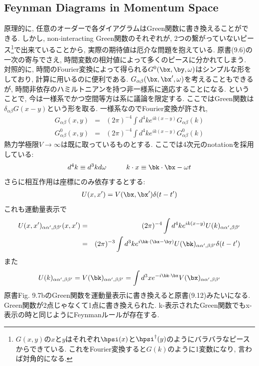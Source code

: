 \documentclass[10.5pt,a4paper]{jreport}
\begin{document}
\subsection{Feynman Diagrams in Momentum Space}
原理的に, 任意のオーダーで各ダイアグラムはGreen関数に書き換えることができる. しかし, non-interacting Green関数のそれぞれが, 2つの繋がっていないピース\footnote{$G(x, y)$の$x$と$y$はそれぞれ$\hpsi(x)$と$\hpsi^\dagger(y)$のようにバラバラなピースからできている. これをFourier変換すると$G(k)$のように1変数になり, 言わば対角的になる. }で出来ていることから, 実際の期待値は厄介な問題を抱えている. 原書(9.6)の一次の寄与でさえ, 時間変数の相対値によって多くのピースに分かれてしまう. 対照的に, 時間のFourier変換によって得られる$G^0(\bx, \by, \omega)$はシンプルな形をしており, 計算に用いるのに便利である. $G_{\alpha\beta}(\bx, \bx', \omega)$を考えることもできるが, 時間非依存のハミルトニアンを持つ非一様系に適応することになる. ということで, 今は一様系でかつ空間等方は系に議論を限定する. ここではGreen関数は$\delta_{\alpha\beta}G(x-y)$という形を取る. 一様系なのでFourier変換が許され,
\begin{eqnarray}
  G_{\alpha\beta}(x, y) &=& (2\pi)^{-4}\int d^4ke^{ik(x-y)}G_{\alpha\beta}(k)\\
  G^0_{\alpha\beta}(x, y) &=& (2\pi)^{-4}\int d^4ke^{ik(x-y)}G^0_{\alpha\beta}(k)
\end{eqnarray}
熱力学極限$V\rightarrow\infty$は既に取っているものとする. ここでは4次元のnotationを採用している:
\begin{eqnarray}
  d^4k \equiv d^3kd\omega\hspace{1.0cm}k\cdot x \equiv \bk\cdot\bx - \omega t
\end{eqnarray}
さらに相互作用は座標にのみ依存するとする:
\begin{eqnarray}
  U(x, x') = V(\bx, \bx')\delta(t-t')
\end{eqnarray}
これも運動量表示で
\begin{eqnarray}
  \nonumber  U(x, x')_{\alpha\alpha', \beta\beta'}(x, x') &=& (2\pi)^{-4}\int d^4ke^{ik(x-y)}U(k)_{\alpha\alpha', \beta\beta'}\\
  &=& (2\pi)^{-3}\int d^3ke^{i\bk\cdot(\bx-\by)}U(\bk)_{\alpha\alpha', \beta\beta'}\delta(t-t')
\end{eqnarray}
また
\begin{eqnarray}
  U(k)_{\alpha\alpha', \beta\beta'} = V(\bk)_{\alpha\alpha', \beta\beta'} = \int d^3xe^{-i\bk\cdot\bx}V(\bx)_{\alpha\alpha', \beta\beta'}
\end{eqnarray}
原書Fig. 9.7bのGreen関数を運動量表示に書き換えると原書(9.12)みたいになる. Green関数が2点じゃなくて1点に書き換えられた. k-表示されたGreen関数でもx-表示の時と同じようにFeynmanルールが存在する.
\end{document}
